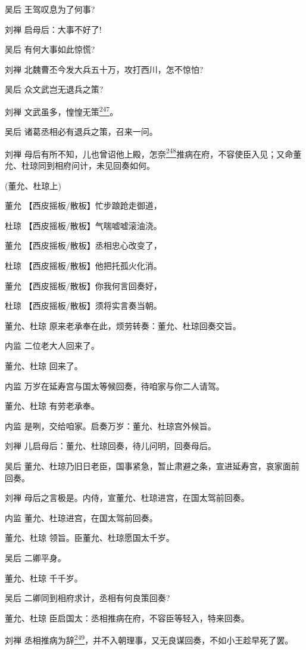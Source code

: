 吴后 王驾叹息为了何事?

刘禅 启母后：大事不好了!

吴后 有何大事如此惊慌?

刘禅 北魏曹丕今发大兵五十万，攻打西川，怎不惊怕?

吴后 众文武岂无退兵之策?

刘禅
文武虽多，惶惶无策\protect\hyperlink{fn247}{\textsuperscript{247}}。

吴后 诸葛丞相必有退兵之策，召来一问。

刘禅
母后有所不知，儿也曾诏他上殿，怎奈\protect\hyperlink{fn248}{\textsuperscript{248}}推病在府，不容使臣入见；又命董允、杜琼同到相府问计，未见回奏如何。

(董允、杜琼上)

董允 【西皮摇板/散板】忙步踉跄走御道，

杜琼 【西皮摇板/散板】气喘嘘嘘滚油浇。

董允 【西皮摇板/散板】丞相忠心改变了，

杜琼 【西皮摇板/散板】他把托孤火化消。

董允 【西皮摇板/散板】你我何言回奏好，

杜琼 【西皮摇板/散板】须将实言奏当朝。

董允、杜琼 原来老承奉在此，烦劳转奏：董允、杜琼回奏交旨。

内监 二位老大人回来了。

董允、杜琼 回来了。

内监 万岁在延寿宫与国太等候回奏，待咱家与你二人请驾。

董允、杜琼 有劳老承奉。

内监 是咧，交给咱家。启奏万岁：董允、杜琼宫外候旨。

刘禅 儿启母后：董允、杜琼回奏，待儿问明，回奏母后。

吴后
董允、杜琼乃旧日老臣，国事紧急，暂止肃避之条，宣进延寿宫，哀家面前回奏。

刘禅 母后之言极是。内侍，宣董允、杜琼进宫，在国太驾前回奏。

内监 董允、杜琼进宫，在国太驾前回奏。

董允、杜琼 领旨。臣董允、杜琼愿国太千岁。

吴后 二卿平身。

董允、杜琼 千千岁。

吴后 二卿同到相府求计，丞相有何良策回奏?

董允、杜琼 臣启国太：丞相推病在府，不容臣等轻入，特来回奏。

刘禅
丞相推病为辞\protect\hyperlink{fn249}{\textsuperscript{249}}，并不入朝理事，又无良谋回奏，不如小王趁早死了罢。

